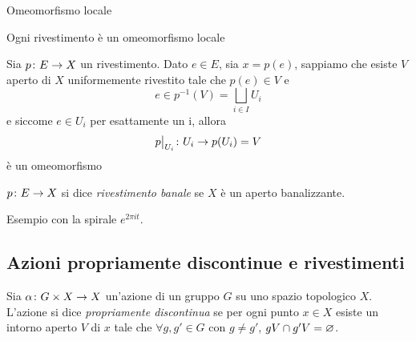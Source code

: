 \documentclass[a4paper]{article}
\begin{document}
\begin{snippetdefinition}{Omeomorfismo locale}
    \todo
\end{snippetdefinition}

\begin{snippetproposition}{}
    Ogni rivestimento è un omeomorfismo locale
\end{snippetproposition}

\begin{snippetproof}{}
    Sia \(p \colon E \to X\) un rivestimento.
    Dato \(e \in E\), sia \(x = p(e)\), sappiamo che esiste \(V\) aperto
    di \(X\) uniformemente rivestito tale che
    \(p(e) \in V\) e
    \[
        e \in p^{-1}(V) = \bigsqcup_{i\in I} U_i
    \]
    e siccome \(e\in U_i\) per esattamente un i, allora
    \[
        \restr{p}{U_i} \colon U_i \fromto p(U_i) = V
    \]
    è un omeomorfismo
\end{snippetproof}

\begin{snippetdefinition}{}
    \(p \colon E \to X\) si dice
    \emph{rivestimento banale}
    se \(X\) è un aperto banalizzante.
\end{snippetdefinition}

\begin{snippetexample}{}
    \todo %
\end{snippetexample}

\begin{snippetexample}{}
    \todo %
    Esempio con la spirale \(e^{2\pi it}\).
\end{snippetexample}

\begin{snippetexample}{}
    \todo %
\end{snippetexample}

\pagebreak

\subsection{Azioni propriamente discontinue e rivestimenti}

\begin{snippetdefinition}{}
    Sia \(\alpha \colon G \times X \to X\)
    un'azione di un gruppo \(G\)
    su uno spazio topologico \(X\).
    L'azione si dice \emph{propriamente discontinua}
    se per ogni punto \(x \in X\) esiste un intorno
    aperto \(V\) di \(x\)
    tale che \(\forall g,g' \in G\) con \(g \neq g'\),
    \(gV \cap g'V = \varnothing\).
\end{snippetdefinition}
\end{document}
